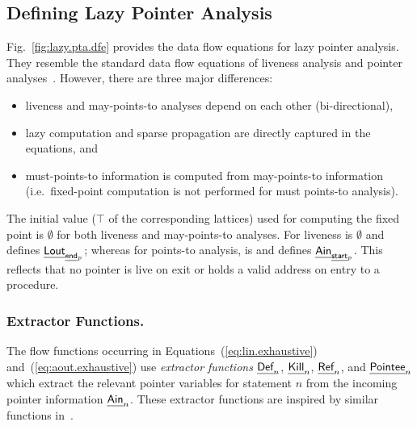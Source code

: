 \documentclass{llncs}
\newcommand{\End}[1]{\text{{\sf\em end}$_{#1}$}\xspace}
\newcommand{\Start}[1]{\text{{\sf\em start}$_{#1}$}\xspace}
\newcommand{\boundary}{\text{\sf\em BI}\xspace}
\newcommand{\lin}{\text{{\sf\em Lin\/}}\xspace}
\newcommand{\ain}{\text{{\sf\em Ain\/}}\xspace}
\newcommand{\lout}{\text{{\sf\em Lout\/}}\xspace}
\newcommand{\Def}{\text{{\sf\em Def}}\xspace}
\newcommand{\Pointee}{\text{{\sf\em Pointee}}\xspace}
\newcommand{\Kill}{\text{{\sf\em Kill}}\xspace}
\newcommand{\Ref}{\text{{\sf\em Ref}}\xspace} \newcommand{\sRef}{\text{{\sf\em sRef}}\xspace}
\begin{document}
\subsection{Defining Lazy Pointer Analysis}
\label{sec:lazy.pta.formulation}



Fig.~\ref{fig:lazy.pta.dfe} provides the data flow equations for lazy
pointer analysis. They resemble the standard data flow equations of
liveness analysis and pointer
analyses~\cite{Khedker.U.Sanyal.A.Karkare.B:2009:Data-Flow-Analysis}.
However, there are three major differences: 
\begin{itemize}
\item liveness and may-points-to analyses depend on each other (bi-directional),
\item lazy computation and sparse propagation are directly captured in the
      equations, and
\item must-points-to information is computed from may-points-to
      information (i.e.\ fixed-point computation is not performed for must
      points-to analysis).
\end{itemize}
The initial value ($\top$ of the corresponding lattices)
used for computing the fixed point is $\emptyset$
for both liveness and may-points-to analyses.
For liveness \boundary is $\emptyset$
and defines $\lout_{\End{p}}$; whereas
for points-to analysis,
\boundary is \text{$\lin_n\times\{?\}$} and defines $\ain_{\Start{p}}$.
This reflects that no pointer is live on exit or holds a valid address
on entry to a procedure.




\subsubsection{Extractor Functions.}
The flow functions occurring in Equations~(\ref{eq:lin.exhaustive})
and~(\ref{eq:aout.exhaustive}) use {\em extractor functions\/} $\Def_n$,
$\Kill_n$, $\Ref_n$, and $\Pointee_n$ which extract the relevant pointer
variables for statement $n$ from the incoming pointer information
$\ain_n$. These extractor functions are inspired by similar functions 
in~\cite{Emami.M.Ghiya.R.Hendren.LJ:1994:Context-sensitive-interprocedural-points-to,Kanade.A.Khedker.UP.Sanyal.A:2005:Heterogeneous-Fixed-Points}. 
\end{document}
